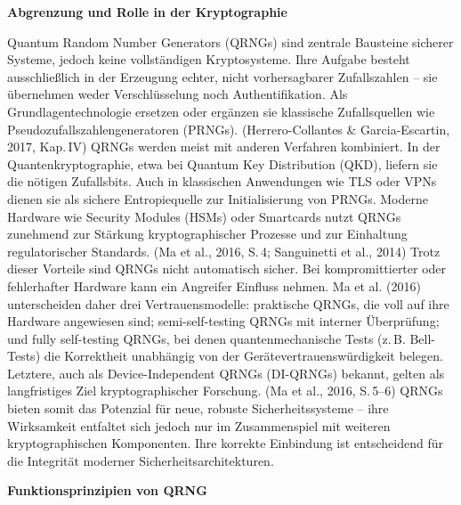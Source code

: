 \vspace{1em}
\noindent\textbf{Abgrenzung und Rolle in der Kryptographie}

\noindent
Quantum Random Number Generators (QRNGs) sind zentrale Bausteine sicherer Systeme, jedoch keine vollständigen Kryptosysteme. Ihre Aufgabe besteht ausschließlich in der Erzeugung echter, nicht vorhersagbarer Zufallszahlen – sie übernehmen weder Verschlüsselung noch Authentifikation. Als Grundlagentechnologie ersetzen oder ergänzen sie klassische Zufallsquellen wie Pseudozufallszahlengeneratoren (PRNGs).
 (Herrero-Collantes & Garcia-Escartin, 2017, Kap. IV)
QRNGs werden meist mit anderen Verfahren kombiniert. In der Quantenkryptographie, etwa bei Quantum Key Distribution (QKD), liefern sie die nötigen Zufallsbits. Auch in klassischen Anwendungen wie TLS oder VPNs dienen sie als sichere Entropiequelle zur Initialisierung von PRNGs. Moderne Hardware wie Security Modules (HSMs) oder Smartcards nutzt QRNGs zunehmend zur Stärkung kryptographischer Prozesse und zur Einhaltung regulatorischer Standards.
 (Ma et al., 2016, S. 4; Sanguinetti et al., 2014)
Trotz dieser Vorteile sind QRNGs nicht automatisch sicher. Bei kompromittierter oder fehlerhafter Hardware kann ein Angreifer Einfluss nehmen. Ma et al. (2016) unterscheiden daher drei Vertrauensmodelle: praktische QRNGs, die voll auf ihre Hardware angewiesen sind; semi-self-testing QRNGs mit interner Überprüfung; und fully self-testing QRNGs, bei denen quantenmechanische Tests (z. B. Bell-Tests) die Korrektheit unabhängig von der Gerätevertrauenswürdigkeit belegen. Letztere, auch als Device-Independent QRNGs (DI-QRNGs) bekannt, gelten als langfristiges Ziel kryptographischer Forschung.
 (Ma et al., 2016, S. 5–6)
QRNGs bieten somit das Potenzial für neue, robuste Sicherheitssysteme – ihre Wirksamkeit entfaltet sich jedoch nur im Zusammenspiel mit weiteren kryptographischen Komponenten. Ihre korrekte Einbindung ist entscheidend für die Integrität moderner Sicherheitsarchitekturen.


\vspace{1em}
\noindent\textbf{Funktionsprinzipien von QRNG}

